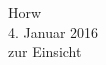 \begin{titlepage}
\begin{center}


\vfill{}
\vfill{}
\vfill{}

{\large Horw\\ 4. Januar 2016\\ zur Einsicht}

\end{center}

\end{titlepage}
